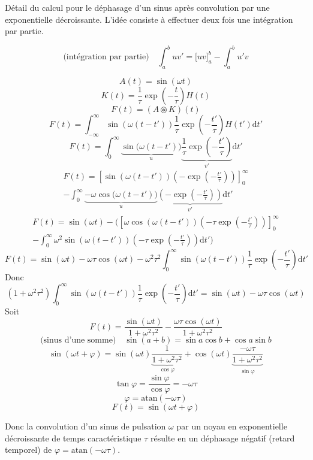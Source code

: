 Détail du calcul pour le déphasage d'un sinus après convolution par une exponentielle décroissante. L'idée consiste à effectuer deux fois une intégration par partie.

$$
\text{(intégration par partie)} \quad \int_a^buv' = \Big[uv\Big]_a^b - \int_a^b u'v
$$

$$ A(t) = \sin(\omega t) $$
$$ K(t) = \frac{1}{\tau}\exp\left(-\frac{t}{\tau}\right)H(t) $$
$$ F(t) = (A\circledast K)(t) $$ 
$$
F(t) = \int_{-\infty}^\infty\sin(\omega(t-t'))\frac{1}{\tau}\exp\left(-\frac{t'}{\tau}\right)H(t')\mathrm{d}t'
$$
$$
F(t) = \int_{0}^\infty\underbrace{\sin\bigg(\omega(t-t')\bigg)}_u\underbrace{\frac{1}{\tau}\exp\left(-\frac{t'}{\tau}\right)}_{v'}\mathrm{d}t'
$$
\begin{multline}
F(t) = \left[\sin(\omega(t-t'))\left(-\exp\left(-\frac{t'}{\tau}\right)\right)\right]_0^\infty \\ -
\int_{0}^\infty\underbrace{-\omega\cos\bigg(\omega(t-t')\bigg)}_u\underbrace{\left(-\exp\left(-\frac{t'}{\tau}\right)\right)}_{v'}\mathrm{d}t'
\end{multline}
\begin{multline}
F(t) = \sin(\omega t) -
\Bigg(\left[\omega\cos(\omega(t-t'))\left(-\tau\exp\left(-\frac{t'}{\tau}\right)\right)\right]_0^\infty \\ -
\int_0^\infty\omega^2\sin(\omega(t-t'))\left(-\tau\exp\left(-\frac{t'}{\tau}\right)\right)\mathrm{d}t' \Bigg)
\end{multline}
$$
F(t) = \sin(\omega t) - \omega\tau\cos(\omega t) - \omega^2\tau^2\int_0^\infty\sin(\omega(t-t')) \frac{1}{\tau}\exp\left(-\frac{t'}{\tau}\right)\mathrm{d}t'
$$
Donc
$$
(1+\omega^2\tau^2)\int_0^\infty\sin(\omega(t-t')) \frac{1}{\tau}\exp\left(-\frac{t'}{\tau}\right)\mathrm{d}t' = \sin(\omega t) - \omega\tau\cos(\omega t)
$$
Soit
$$
F(t) = \frac{\sin(\omega t)}{1+\omega^2\tau^2} - \frac{\omega\tau\cos(\omega t)}{1+\omega^2\tau^2}
$$
$$ \text{(sinus d'une somme)}  \quad  \sin(a+b) = \sin a\cos b + \cos a\sin b $$
$$
\sin(\omega t+\varphi) = \sin(\omega t)\underbrace{\frac{1}{1+\omega^2\tau^2}}_{\cos\varphi} + \cos(\omega t)\underbrace{\frac{-\omega\tau}{1+\omega^2\tau^2}}_{\sin\varphi}
$$
$$ \tan\varphi = \frac{\sin\varphi}{\cos\varphi} = -\omega\tau $$
$$ \varphi = \mathrm{atan}(-\omega\tau) $$
$$ F(t) = \sin(\omega t + \varphi) $$

Donc la convolution d'un sinus de pulsation $\omega$ par un noyau en exponentielle décroissante de temps caractéristique $\tau$ résulte en un déphasage négatif (retard temporel) de $ \varphi = \mathrm{atan}(-\omega\tau) $.


